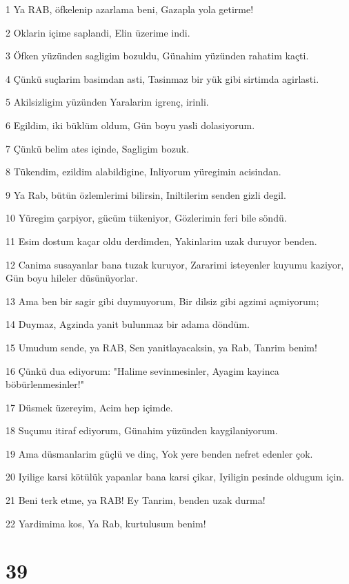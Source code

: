 \par 1 Ya RAB, öfkelenip azarlama beni, Gazapla yola getirme!
\par 2 Oklarin içime saplandi, Elin üzerime indi.
\par 3 Öfken yüzünden sagligim bozuldu, Günahim yüzünden rahatim kaçti.
\par 4 Çünkü suçlarim basimdan asti, Tasinmaz bir yük gibi sirtimda agirlasti.
\par 5 Akilsizligim yüzünden Yaralarim igrenç, irinli.
\par 6 Egildim, iki büklüm oldum, Gün boyu yasli dolasiyorum.
\par 7 Çünkü belim ates içinde, Sagligim bozuk.
\par 8 Tükendim, ezildim alabildigine, Inliyorum yüregimin acisindan.
\par 9 Ya Rab, bütün özlemlerimi bilirsin, Iniltilerim senden gizli degil.
\par 10 Yüregim çarpiyor, gücüm tükeniyor, Gözlerimin feri bile söndü.
\par 11 Esim dostum kaçar oldu derdimden, Yakinlarim uzak duruyor benden.
\par 12 Canima susayanlar bana tuzak kuruyor, Zararimi isteyenler kuyumu kaziyor, Gün boyu hileler düsünüyorlar.
\par 13 Ama ben bir sagir gibi duymuyorum, Bir dilsiz gibi agzimi açmiyorum;
\par 14 Duymaz, Agzinda yanit bulunmaz bir adama döndüm.
\par 15 Umudum sende, ya RAB, Sen yanitlayacaksin, ya Rab, Tanrim benim!
\par 16 Çünkü dua ediyorum: "Halime sevinmesinler, Ayagim kayinca böbürlenmesinler!"
\par 17 Düsmek üzereyim, Acim hep içimde.
\par 18 Suçumu itiraf ediyorum, Günahim yüzünden kaygilaniyorum.
\par 19 Ama düsmanlarim güçlü ve dinç, Yok yere benden nefret edenler çok.
\par 20 Iyilige karsi kötülük yapanlar bana karsi çikar, Iyiligin pesinde oldugum için.
\par 21 Beni terk etme, ya RAB! Ey Tanrim, benden uzak durma!
\par 22 Yardimima kos, Ya Rab, kurtulusum benim!

\chapter{39}

